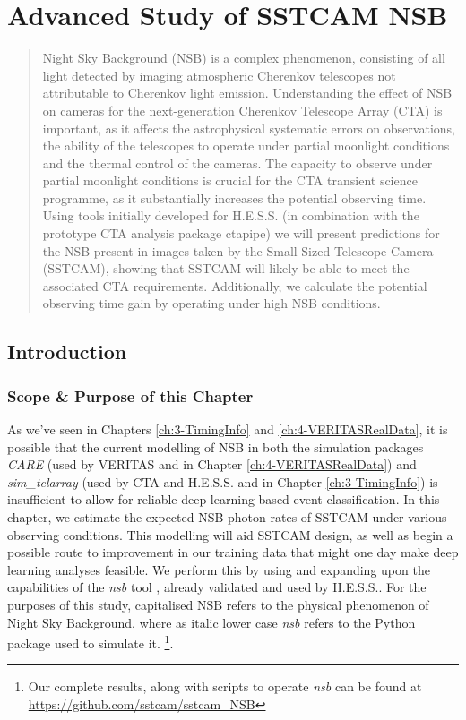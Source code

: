 \chapter{\label{ch:5-CHECNSB} Advanced Study of SSTCAM NSB}
\minitoc
\begin{abstract}
    Night Sky Background (NSB) is a complex phenomenon, consisting of all light detected by imaging atmospheric Cherenkov telescopes not attributable to Cherenkov light emission. Understanding the effect of NSB on cameras for the next-generation Cherenkov Telescope Array (CTA) is important, as it affects the astrophysical systematic errors on observations, the ability of the telescopes to operate under partial moonlight conditions and the thermal control of the cameras. The capacity to observe under partial moonlight conditions is crucial for the CTA transient science programme, as it substantially increases the potential observing time. Using tools initially developed for H.E.S.S. (in combination with the prototype CTA analysis package ctapipe) we will present predictions for the NSB present in images taken by the Small Sized Telescope Camera (SSTCAM), showing that SSTCAM will likely be able to meet the associated CTA requirements. Additionally, we calculate the potential observing time gain by operating under high NSB conditions.
\end{abstract}

\section{Introduction}
\label{sec:intro}

\subsection{Scope \& Purpose of this Chapter}
\label{sec:intro:scope}
As we've seen in Chapters \ref{ch:3-TimingInfo} and \ref{ch:4-VERITASRealData}, it is possible that the current modelling of NSB in both the simulation packages \textit{CARE} (used by VERITAS and in Chapter \ref{ch:4-VERITASRealData}) and \textit{sim\_telarray} (used by CTA and H.E.S.S. and in Chapter \ref{ch:3-TimingInfo}) is insufficient to allow for reliable deep-learning-based event classification. In this chapter, we estimate the expected NSB photon rates of SSTCAM under various observing conditions. This modelling will aid SSTCAM design, as well as begin a possible route to improvement in our training data that might one day make deep learning analyses feasible. We perform this by using and expanding upon the capabilities of the \textit{nsb} tool \cite{nsb}, already validated and used by H.E.S.S.. For the purposes of this study, capitalised NSB refers to the physical phenomenon of Night Sky Background, where as italic lower case \textit{nsb} refers to the Python package used to simulate it. \footnote{Our complete results, along with scripts to operate \textit{nsb} can be found at \url{https://github.com/sstcam/sstcam_NSB}}. 

